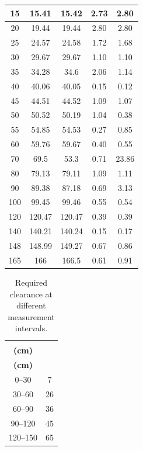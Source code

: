 \begin{table}[!t]
\begin{tabular}{|c|c|c|c|c|}
15 & 15.41 & 15.42 & 2.73 & 2.80 \\ \hline
20 & 19.44 & 19.44 & 2.80 & 2.80 \\ \hline
25 & 24.57 & 24.58 & 1.72 & 1.68 \\ \hline
30 & 29.67 & 29.67 & 1.10 & 1.10 \\ \hline
35 & 34.28 & 34.6 & 2.06 & 1.14 \\ \hline
40 & 40.06 & 40.05 & 0.15 & 0.12 \\ \hline
45 & 44.51 & 44.52 & 1.09 & 1.07 \\ \hline
50 & 50.52 & 50.19 & 1.04 & 0.38 \\ \hline
55 & 54.85 & 54.53 & 0.27 & 0.85 \\ \hline
60 & 59.76 & 59.67 & 0.40 & 0.55 \\ \hline
70 & 69.5 & 53.3 & 0.71 & 23.86 \\ \hline
80 & 79.13 & 79.11 & 1.09 & 1.11 \\ \hline
90 & 89.38 & 87.18 & 0.69 & 3.13 \\ \hline
100 & 99.45 & 99.46 & 0.55 & 0.54 \\ \hline
120 & 120.47 & 120.47 & 0.39 & 0.39 \\ \hline
140 & 140.21 & 140.24 & 0.15 & 0.17 \\ \hline
148 & 148.99 & 149.27 & 0.67 & 0.86 \\ \hline
165 & 166 & 166.5 & 0.61 & 0.91 \\ \hline
\end{tabular}
\end{table}

\begin{table}[!t]
\centering
\caption{Required clearance at different measurement intervals.}
\scriptsize
\setlength{\tabcolsep}{4pt}
\begin{tabular}{|c|c|}
\hline
\shortstack{\textbf{Distance range}\\\textbf{(cm)}} & \shortstack{\textbf{Required clearance}\\\textbf{(cm)}} \\ \hline
0--30 & 7 \\ \hline
30--60 & 26 \\ \hline
60--90 & 36 \\ \hline
90--120 & 45 \\ \hline
120--150 & 65 \\ \hline
\end{tabular}
\end{table}

